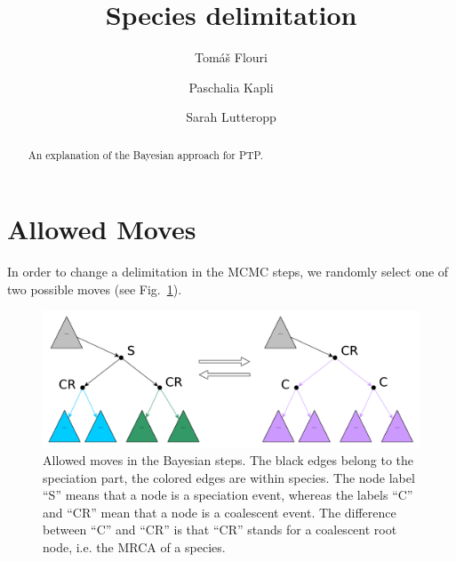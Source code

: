 \documentclass{llncs}
\begin{document}
\title{Species delimitation}


\author{Tom\'{a}\v{s} Flouri \and Paschalia Kapli \and Sarah Lutteropp}

\maketitle

\begin{abstract}
An explanation of the Bayesian approach for PTP.\@
\end{abstract}

\section{Allowed Moves}

In order to change a delimitation in the MCMC steps, we randomly select one of two possible moves (see Fig.~\ref{fig:moves}).

\begin{figure}[h!]
\centering
\includegraphics[scale=0.4]{images/moves.pdf}
\caption{Allowed moves in the Bayesian steps. The black edges belong to the speciation part, the colored edges are within species. The node label ``S'' means that a node is a speciation event, whereas the labels ``C'' and ``CR'' mean that a node is a coalescent event. The difference between ``C'' and ``CR'' is that ``CR'' stands for a coalescent root node, i.e. the MRCA of a species.}
\label{fig:moves}
\end{figure}



\end{document}
